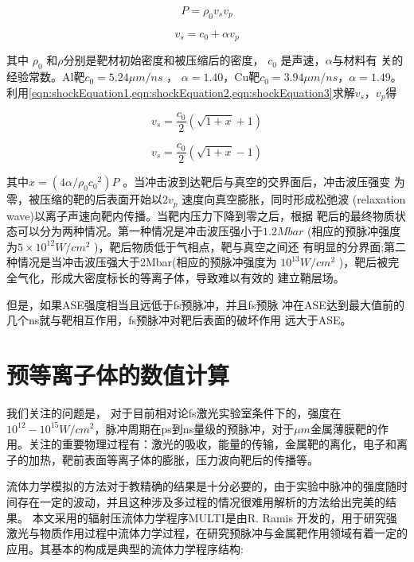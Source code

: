 \begin{equation}
\label{eqn:shockEquation2}
P= \rho_0 v_s  v_p
\end{equation}     

\begin{equation}
\label{eqn:shockEquation3}
v_s = c_0 + \alpha v_p
\end{equation}     

其中 $\rho_0$ 和$\rho$分别是靶材初始密度和被压缩后的密度， $c_0$ 是声速，$\alpha$与材料有
关的经验常数。Al靶$c_0=5.24 \mu m/ns$ ， $\alpha=1.40$，Cu靶$c_0=3.94 \mu m/ns$，$\alpha=1.49$\cite{lundh2007influence}。利用\ref{eqn:shockEquation1,eqn:shockEquation2,eqn:shockEquation3}求解$v_s$，$v_p$得

\begin{equation}
\label{eqn:shockV}
v_s = \frac{c_0}{2} (\sqrt{1+x}+1)
\end{equation} 

\begin{equation}
\label{eqn:pressureV}
v_s = \frac{c_0}{2}(\sqrt{1+x}-1)
\end{equation} 


其中$x=(4 \alpha / {\rho}_0 {c_0}^2)P$ 。当冲击波到达靶后与真空的交界面后，冲击波压强变
为零，被压缩的靶的后表面开始以$2v_p$ 速度向真空膨胀，同时形成松弛波
(relaxation wave)以离子声速向靶内传播。当靶内压力下降到零之后，根据
靶后的最终物质状态可以分为两种情况。第一种情况是冲击波压强小于$1.2Mbar$
(相应的预脉冲强度为$5 \times {10}^{12}W/{cm}^2$ )，靶后物质低于气相点，靶与真空之间还
有明显的分界面;第二种情况是当冲击波压强大于2Mbar(相应的预脉冲强度为
${10}^{13}W/{cm}^2$ )，靶后被完全气化，形成大密度标长的等离子体，导致难以有效的
建立鞘层场\cite{batani2010effects}。

但是，如果ASE强度相当且远低于fs预脉冲，并且fs预脉
冲在ASE达到最大值前的几个ns就与靶相互作用，fs预脉冲对靶后表面的破坏作用
远大于ASE。




\section{预等离子体的数值计算}


我们关注的问题是， 对于目前相对论fs激光实验室条件下的，强度在$10^{12}-10^{15} W/cm^2$，脉冲周期在ps到ns量级的预脉冲，对于$\mu m$金属薄膜靶的作用。关注的重要物理过程有：激光的吸收，能量的传输，金属靶的离化，电子和离子的加热，靶前表面等离子体的膨胀，压力波向靶后的传播等。

流体力学模拟的方法对于教精确的结果是十分必要的，由于实验中脉冲的强度随时间存在一定的波动，并且这种涉及多过程的情况很难用解析的方法给出完美的结果。
本文采用的辐射压流体力学程序MULTI是由R. Ramis 开发的，用于研究强激光与物质作用过程中流体力学过程，在研究预脉冲与金属靶作用领域有着一定的应用。其基本的构成是典型的流体力学程序结构:


